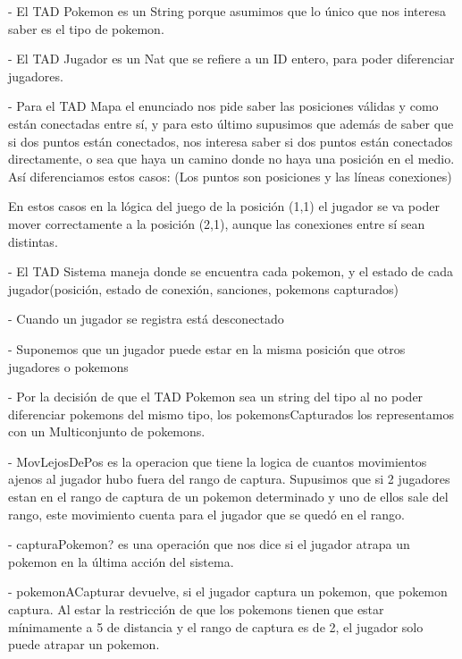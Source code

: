 - El TAD Pokemon es un String porque asumimos que lo \'unico que nos interesa saber es el tipo de pokemon.

- El TAD Jugador es un Nat que se refiere a un ID entero, para poder diferenciar jugadores.

- Para el TAD Mapa el enunciado nos pide saber las posiciones v\'alidas y como est\'an conectadas entre s\'i, y para esto \'ultimo supusimos que  adem\'as de saber que si dos puntos est\'an conectados, nos interesa saber si dos puntos est\'an conectados directamente, o sea que haya un camino donde no haya una posici\'on en el medio.
As\'i diferenciamos estos casos: (Los puntos son posiciones y las l\'ineas conexiones)
	
En estos casos en la l\'ogica del juego de la posici\'on (1,1) el jugador se va poder mover correctamente a la posici\'on (2,1), aunque las conexiones entre s\'i sean distintas.

- El TAD Sistema maneja donde se encuentra cada pokemon, y el estado de cada jugador(posici\'on, estado de conexi\'on, sanciones, pokemons capturados)

- Cuando un jugador se registra est\'a desconectado

- Suponemos que un jugador puede estar en la misma posici\'on que otros jugadores o pokemons

- Por la decisi\'on de que el TAD Pokemon sea un string del tipo al no poder diferenciar pokemons del mismo tipo, los pokemonsCapturados los representamos con un Multiconjunto de pokemons.

- MovLejosDePos es la operacion que tiene la logica de cuantos movimientos ajenos al jugador hubo fuera del rango de captura. Supusimos que si 2 jugadores estan en el rango de captura de un pokemon determinado y uno de ellos sale del rango, este movimiento cuenta para el jugador que se qued\'o en el rango.

- capturaPokemon? es una operaci\'on que nos dice si el jugador atrapa un pokemon en la \'ultima acci\'on del sistema.

- pokemonACapturar devuelve, si el jugador captura un pokemon, que pokemon captura. Al estar la restricci\'on de que los pokemons tienen que estar m\'inimamente a 5 de distancia y el rango de captura es de 2, el jugador solo puede atrapar un pokemon.
